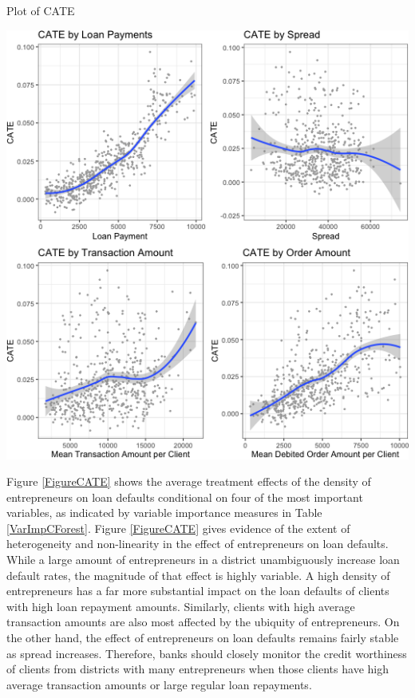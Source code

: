 \documentclass[11pt,preprint, authoryear]{elsarticle}
\let\origfigure\figure
\let\endorigfigure\endfigure
\renewenvironment{figure}[1][2] {
    \expandafter\origfigure\expandafter[H]
} {
    \endorigfigure
}
\numberwithin{equation}{section}
\numberwithin{figure}{section}
\numberwithin{table}{section}
\begin{document}
Plot of CATE

\begin{figure}[H]

{\centering \includegraphics{DS-Report-20065124_files/figure-latex/FigureCATE-1} 

}

\caption{Conditional Average Treatment Effects (CATE) for 4 Important Variables \label{FigureCATE}}\label{fig:FigureCATE}
\end{figure}

Figure \ref{FigureCATE} shows the average treatment effects of the
density of entrepreneurs on loan defaults conditional on four of the
most important variables, as indicated by variable importance measures
in Table \ref{VarImpCForest}. Figure \ref{FigureCATE} gives evidence of
the extent of heterogeneity and non-linearity in the effect of
entrepreneurs on loan defaults. While a large amount of entrepreneurs in
a district unambiguously increase loan default rates, the magnitude of
that effect is highly variable. A high density of entrepreneurs has a
far more substantial impact on the loan defaults of clients with high
loan repayment amounts. Similarly, clients with high average transaction
amounts are also most affected by the ubiquity of entrepreneurs. On the
other hand, the effect of entrepreneurs on loan defaults remains fairly
stable as spread increases. Therefore, banks should closely monitor the
credit worthiness of clients from districts with many entrepreneurs when
those clients have high average transaction amounts or large regular
loan repayments.
\end{document}
